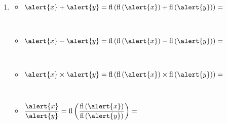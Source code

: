 \begin{frame}
	\begin{solution}
		\begin{enumerate}

			\item

			      \begin{multicols}{2}
				      \begin{itemize}
					      \item

					            \begin{math}
						            \alert{x}+\alert{y}=
						            \operatorname{fl}
						            \left(
						            \operatorname{fl}\left(\alert{x}\right)+
						            \operatorname{fl}\left(\alert{y}\right)
						            \right)=
					            \end{math}

					            \

					      \item

					            \begin{math}
						            \alert{x}-\alert{y}=
						            \operatorname{fl}
						            \left(
						            \operatorname{fl}\left(\alert{x}\right)-
						            \operatorname{fl}\left(\alert{y}\right)
						            \right)=
					            \end{math}

					            \

					      \item

					            \begin{math}
						            \alert{x}\times\alert{y}=
						            \operatorname{fl}
						            \left(
						            \operatorname{fl}\left(\alert{x}\right)\times
						            \operatorname{fl}\left(\alert{y}\right)
						            \right)=
					            \end{math}

					            \

					      \item

					            \begin{math}
						            \dfrac{\alert{x}}{\alert{y}}=
						            \operatorname{fl}
						            \left(
						            \dfrac{
							            \operatorname{fl}\left(\alert{x}\right)
						            }{
							            \operatorname{fl}\left(\alert{y}\right)
						            }
						            \right)=
					            \end{math}
				      \end{itemize}
			      \end{multicols}


\end{enumerate}
\end{solution}
\end{frame}
